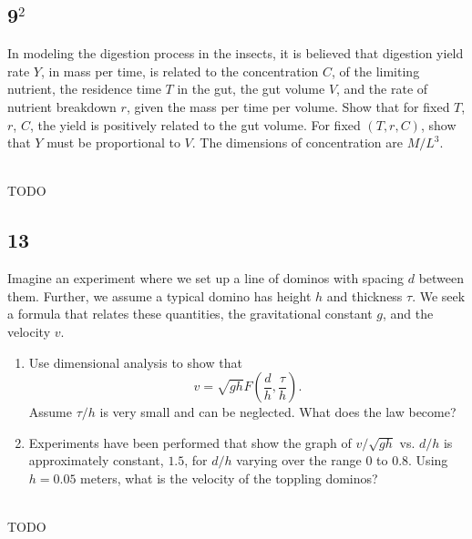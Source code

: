 \documentclass[12pt]{article}
\begin{document}
\subsection{9$^2$}
\begin{Ex}
  In modeling the digestion process in the insects, it is believed that
  digestion yield rate $Y$, in mass per time, is related to the concentration
  $C$, of the limiting nutrient, the residence time $T$ in the gut, the gut
  volume $V$, and the rate of nutrient breakdown $r$, given the mass per time
  per volume. Show that for fixed $T$, $r$, $C$, the yield is positively related
  to the gut volume. For fixed $(T,r,C)$, show that $Y$ must be proportional to
  $V$. The dimensions of concentration are $M/L^3$.
  \begin{solution} \hfill \vspace{.75em} \\
    {\huge \color{red}TODO}
  \end{solution}
\end{Ex}

\subsection{13}
\begin{Ex}
  Imagine an experiment where we set up a line of dominos with spacing $d$
  between them. Further, we assume a typical domino has height $h$ and thickness
  $\tau$. We seek a formula that relates these quantities, the gravitational
  constant $g$, and the velocity $v$.

  \begin{enumerate}
  \item Use dimensional analysis to show
    that $$v=\sqrt{gh}F\left(\frac{d}{h},\frac{\tau}{h}\right).$$
    Assume $\tau/h$ is very small and can be neglected. What does the law become?
  \item Experiments have been performed that show the graph of $v/\sqrt{gh}$ vs.
    $d/h$ is approximately constant, $1.5$, for $d/h$ varying over the range $0$
    to $0.8$. Using $h=0.05$ meters, what is the velocity of the toppling dominos?
  \end{enumerate}
  \begin{solution} \hfill \vspace{.75em} \\
    {\huge \color{red}TODO}
  \end{solution}
\end{Ex}
\end{document}
